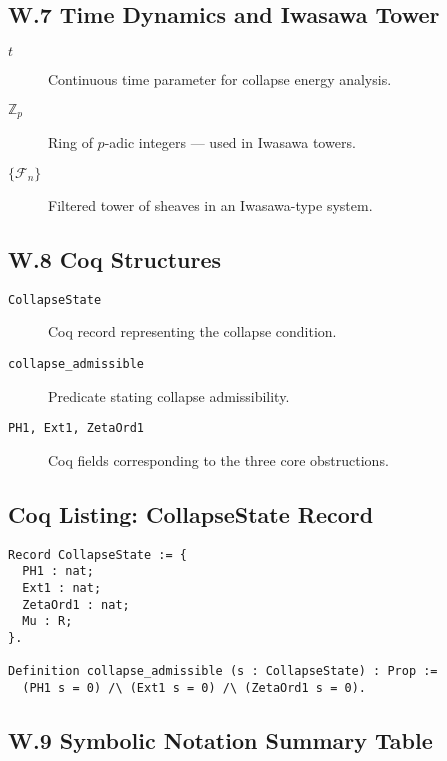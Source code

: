 \documentclass[11pt]{article}
\begin{document}
\subsection*{W.7 Time Dynamics and Iwasawa Tower}

\begin{description}
  \item[\( t \)] Continuous time parameter for collapse energy analysis.
  \item[\( \mathbb{Z}_p \)] Ring of \( p \)-adic integers — used in Iwasawa towers.
  \item[\( \{ \mathcal{F}_n \} \)] Filtered tower of sheaves in an Iwasawa-type system.
\end{description}

\subsection*{W.8 Coq Structures}

\begin{description}
  \item[\texttt{CollapseState}] Coq record representing the collapse condition.
  \item[\texttt{collapse\_admissible}] Predicate stating collapse admissibility.
  \item[\texttt{PH1, Ext1, ZetaOrd1}] Coq fields corresponding to the three core obstructions.
\end{description}

\subsection*{Coq Listing: CollapseState Record}
\begin{lstlisting}[language=Coq]
Record CollapseState := {
  PH1 : nat;
  Ext1 : nat;
  ZetaOrd1 : nat;
  Mu : R;
}.

Definition collapse_admissible (s : CollapseState) : Prop :=
  (PH1 s = 0) /\ (Ext1 s = 0) /\ (ZetaOrd1 s = 0).
\end{lstlisting}

\subsection*{W.9 Symbolic Notation Summary Table}
\end{document}
